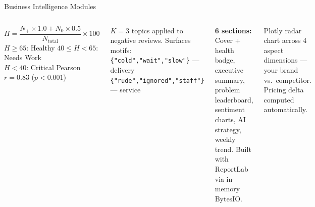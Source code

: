 \documentclass[aspectratio=169]{beamer}
\begin{document}
\begin{frame}{Business Intelligence Modules}
  \begin{columns}[T]
      \begin{tcolorbox}[colback=navyblue!6, colframe=navyblue, arc=5pt,
                        title={\small\faTachometerAlt\ Business Health Score},
                        fonttitle=\color{white}, colbacktitle=navyblue]
        \small
        \[H = \frac{N_+\times1.0 + N_0\times0.5}{N_{\text{total}}} \times 100\]
        \textcolor{posgreen}{$H \geq 65$}: Healthy\quad
        \textcolor{neuyellow}{$40 \leq H < 65$}: Needs Work\\
        \textcolor{negred}{$H < 40$}: Critical\quad
        Pearson $r = 0.83$ ($p < 0.001$)
      \end{tcolorbox}
      \vspace{0.2cm}
      \begin{tcolorbox}[colback=navyblue!6, colframe=accentblue, arc=5pt,
                        title={\small\faSearch\ LDA Topic Modeling},
                        fonttitle=\color{white}, colbacktitle=accentblue]
        \small $K=3$ topics applied to negative reviews.
        Surfaces motifs:\\
        \texttt{\{"cold","wait","slow"\}} --- delivery\\
        \texttt{\{"rude","ignored","staff"\}} --- service
      \end{tcolorbox}
      \begin{tcolorbox}[colback=navyblue!6, colframe=posgreen!60!black, arc=5pt,
                        title={\small\faFilePdf\ PDF Report Generator},
                        fonttitle=\color{white}, colbacktitle=posgreen!60!black]
        \small \textbf{6 sections:} Cover + health badge, executive
        summary, problem leaderboard, sentiment charts, AI strategy,
        weekly trend. Built with ReportLab via in-memory BytesIO.
      \end{tcolorbox}
      \vspace{0.2cm}
      \begin{tcolorbox}[colback=negred!8, colframe=negred, arc=5pt,
                        title={\small\faBalanceScale\ Competitor Benchmarking},
                        fonttitle=\color{white}, colbacktitle=negred]
        \small Plotly radar chart across 4 aspect dimensions ---
        your brand vs.\ competitor.
        Pricing delta computed automatically.
      \end{tcolorbox}
  \end{columns}
\end{frame}
\end{document}
